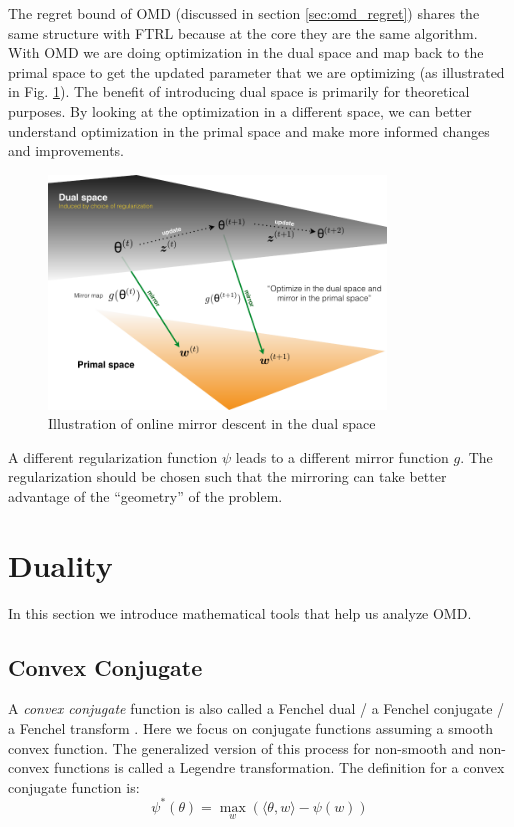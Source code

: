 \documentclass[11pt]{article}
\begin{document}
The regret bound of OMD (discussed in section \ref{sec:omd_regret}) shares the same structure with FTRL because at the core they are the same algorithm. With OMD we are doing optimization in the dual space and map back to the primal space to get the updated parameter that we are optimizing (as illustrated in Fig. \ref{fig:dual_primal}). The benefit of introducing dual space is primarily for theoretical purposes. By looking at the optimization in a different space, we can better understand optimization in the primal space and make more informed changes and improvements.

\begin{figure}[h]
    \centering
    \includegraphics[width=0.8\textwidth]{figures/dual_primal.pdf}
    \caption{Illustration of online mirror descent in the dual space}
    \label{fig:dual_primal}
\end{figure}

A different regularization function $\psi$ leads to a different mirror function $g$. The regularization should be chosen such that the mirroring can take better advantage of the ``geometry'' of the problem.

\section{Duality}
In this section we introduce mathematical tools that help us analyze OMD.

\subsection{Convex Conjugate}
A \textit{convex conjugate} function is also called a Fenchel dual / a Fenchel conjugate / a Fenchel transform \cite{wiki:convex_conjugate}. Here we focus on conjugate functions assuming a smooth convex function. The generalized version of this process for non-smooth and non-convex functions is called a Legendre transformation. The definition for a convex conjugate function is:
\begin{equation}
    \label{eqn:convex_conjugate}
    \psi^* (\theta) = \max_w (\langle \theta, w \rangle - \psi(w))
\end{equation}
\end{document}
